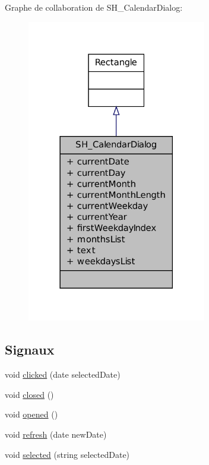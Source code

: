 Graphe de collaboration de S\-H\-\_\-\-Calendar\-Dialog\-:\nopagebreak
\begin{figure}[H]
\begin{center}
\leavevmode
\includegraphics[width=222pt]{classSH__CalendarDialog__coll__graph}
\end{center}
\end{figure}
\subsection*{Signaux}
\begin{DoxyCompactItemize}
\item 
void \hyperlink{classSH__CalendarDialog_adc1e1f6d36a960208d514b755d6dcbce}{clicked} (date selected\-Date)
\item 
void \hyperlink{classSH__CalendarDialog_af19f989c106fa3dc9bebfdce81f725a7}{closed} ()
\item 
void \hyperlink{classSH__CalendarDialog_a1d6508a56b50647f3fec511088441728}{opened} ()
\item 
void \hyperlink{classSH__CalendarDialog_a8f5eeb3f224244a233d0c757840cc3ed}{refresh} (date new\-Date)
\item 
void \hyperlink{classSH__CalendarDialog_a4513e8bce3e2bca355c8ce130eacfef1}{selected} (string selected\-Date)
\end{DoxyCompactItemize}
